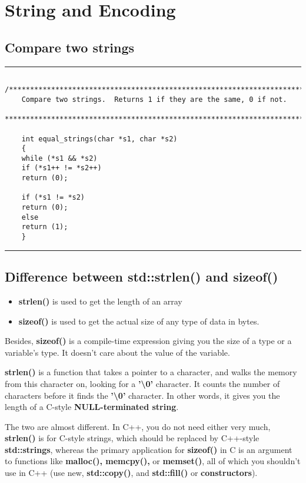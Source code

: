 	\chapter{String and Encoding}	

	\section{Compare two strings}
	\noindent\vspace{1em}\hrule
	\begin{verbatim}
	/******************************************************************************
	Compare two strings.  Returns 1 if they are the same, 0 if not.
	******************************************************************************/
	
	int equal_strings(char *s1, char *s2)
	{
	while (*s1 && *s2)
	if (*s1++ != *s2++)
	return (0);
	
	if (*s1 != *s2)
	return (0);
	else
	return (1);
	}
	\end{verbatim}
	\noindent\hrule\vspace{1em}

	\section{Difference between std::strlen() and sizeof()}
	\begin{itemize}
		\item \textbf{strlen()} is used to get the length of an array
		\item \textbf{sizeof()} is used to get the actual size of any type of data in bytes.
	\end{itemize}
	
	Besides, \textbf{sizeof()} is a compile-time expression giving you the size of a type or a variable's type. It doesn't care about the value of the variable.
	
	\textbf{strlen()} is a function that takes a pointer to a character, and walks the memory from this character on, looking for a \textbf{'\textbackslash 0'} character. It counts the number of characters before it finds the \textbf{'\textbackslash 0'} character. In other words, it gives you the length of a C-style \textbf{NULL-terminated string}.
	
	The two are almost different. In C++, you do not need either very much, \textbf{strlen()} is for C-style strings, which should be replaced by C++-style \textbf{std::strings}, whereas the primary application for \textbf{sizeof()} in C is an argument to functions like \textbf{malloc(), memcpy(),} or \textbf{memset()}, all of which you shouldn't use in C++ (use new, \textbf{std::copy()}, and \textbf{std::fill()} or \textbf{constructors}).
	
